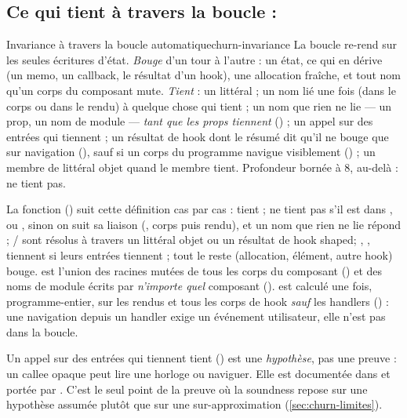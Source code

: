 \subsection{Ce qui tient à travers la boucle : }


\begin{definition}{Invariance à travers la boucle automatique}{churn-invariance}
La boucle re-rend sur les seules écritures d'état. \emph{Bouge} d'un tour à l'autre : un
état, ce qui en dérive (un memo, un callback, le résultat d'un hook), une allocation
fraîche, et tout nom qu'un corps du composant mute. \emph{Tient} : un littéral ; un nom lié
une fois (dans le corps ou dans le rendu) à quelque chose qui tient ; un nom que rien ne
lie --- un prop, un nom de module --- \emph{tant que les props tiennent}
() ; un appel sur des entrées qui tiennent ; un résultat de hook dont le
résumé dit qu'il ne bouge que sur navigation (), sauf si un corps
du programme navigue visiblement () ; un membre de littéral objet quand le
membre tient. Profondeur bornée à 8, au-delà : ne tient pas.
\end{definition}

La fonction  () suit cette
définition cas par cas :  tient ;  ne tient pas s'il est dans
,  ou , sinon on suit sa liaison
(, corps puis rendu), et un nom que rien ne lie répond  ;
/ sont résolus à travers un littéral objet ou un
résultat de hook \og shaped\fg ; , ,  tiennent si
leurs entrées tiennent ; tout le reste (allocation, élément, autre hook) bouge.
 est l'union des racines mutées de tous les corps du composant
() et des noms de module écrits par \emph{n'importe quel} composant
().  est calculé une fois,
programme-entier, sur les rendus et tous les corps de hook \emph{sauf} les handlers
() : une navigation depuis un handler exige un événement
utilisateur, elle n'est pas dans la boucle.

\begin{piege}
\og Un appel sur des entrées qui tiennent tient\fg{} ()
est une \emph{hypothèse}, pas une preuve : un callee opaque peut lire une horloge ou
naviguer. Elle est documentée dans  et portée par .
C'est le seul point de la preuve où la soundness repose sur une hypothèse assumée plutôt
que sur une sur-approximation (\cref{sec:churn-limites}).
\end{piege}


